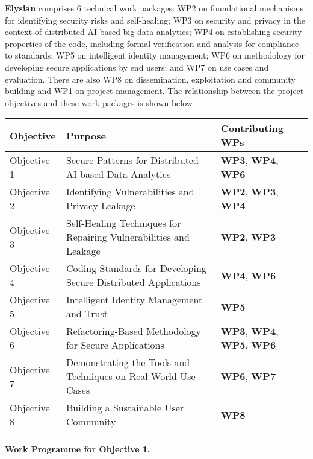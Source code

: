 \documentclass[a4paper,11pt]{article}
\newcommand{\project}[1]{\textbf{#1}\xspace}
\newcommand{\SECURITY}{\project{Elysian}}
\newcommand{\TheProject}{\SECURITY}
\begin{document}
\TheProject{} comprises 6 technical work packages: WP2 on foundational mechanisms for identifying security risks and self-healing; WP3 on security and privacy in the context of distributed AI-based big data analytics; WP4 on establishing security properties of the code, including formal verification and analysis for compliance to standards; WP5 on intelligent identity management; WP6 on methodology for developing secure applications by end users; and WP7 on use cases and evaluation. There are also WP8 on dissemination, exploitation and community building and WP1 on project management. The relationship between the project objectives and these work packages is shown below

\vspace{-8pt}
\begin{center}
\begin{tabular}{|l|l|l|}\hline
\textbf{Objective} & \textbf{Purpose} & \textbf{Contributing WPs} \\\hline \hline
Objective 1 & Secure Patterns for Distributed AI-based Data Analytics & \textbf{WP3}, \textbf{WP4}, \textbf{WP6} \\\hline
Objective 2 & Identifying Vulnerabilities and Privacy Leakage & \textbf{WP2}, \textbf{WP3}, \textbf{WP4} \\\hline
Objective 3 & Self-Healing Techniques for Repairing Vulnerabilities and Leakage & \textbf{WP2}, \textbf{WP3} \\\hline
Objective 4 & Coding Standards for Developing Secure Distributed Applications & \textbf{WP4}, \textbf{WP6} \\\hline
Objective 5 & Intelligent Identity Management and Trust & \textbf{WP5} \\\hline
Objective 6 & Refactoring-Based Methodology for Secure Applications & \textbf{WP3}, \textbf{WP4}, \textbf{WP5}, \textbf{WP6} \\\hline
Objective 7 & Demonstrating the Tools and Techniques on Real-World Use Cases & \textbf{WP6}, \textbf{WP7}\\\hline
Objective 8 & Building a Sustainable User Community & \textbf{WP8}\\\hline
\end{tabular}
\end{center}

\paragraph*{Work Programme for Objective 1.}
\end{document}
